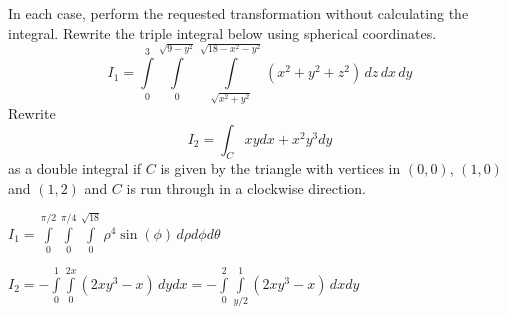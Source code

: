 \begin{Exercise} %
In each case, perform the requested transformation without calculating the integral. 
\Question Rewrite the triple integral below using spherical coordinates.
$$
I_1=\displaystyle\int\limits_0^3\int\limits_0^{\sqrt{9-y^2}}\int\limits_{\sqrt{x^2+y^2}}^{\sqrt{18-x^2-y^2}}\left(x^2+y^2+z^2\right)\,dz\,dx\,dy
$$
\Question Rewrite
$$
I_2=\int_C xy dx+x^2y^3 dy
$$
as a double integral if $C$ is given by the triangle with vertices in $(0,0)$, $(1,0)$ and $(1,2)$ and $C$ is run through in a clockwise direction.
\EndCurrentQuestion
\end{Exercise} 
\begin{Answer}\phantom{}
\Question $I_1 = \displaystyle \int \limits_0^{\pi/2}  \int \limits_0^{\pi/4} \int \limits_0^{\sqrt{18}} \rho^4 \sin(\phi) \, d \rho d \phi d \theta $

\Question $I_2 = -\displaystyle \int \limits_0^{1}  \int \limits_0^{2x} \left( 2xy^3 - x \right) \, dy dx  = -\displaystyle \int \limits_0^{2}  \int \limits_{y/2}^{1} \left( 2xy^3 - x \right) \, dx dy$

\end{Answer}


\fi







\ifcalculus
